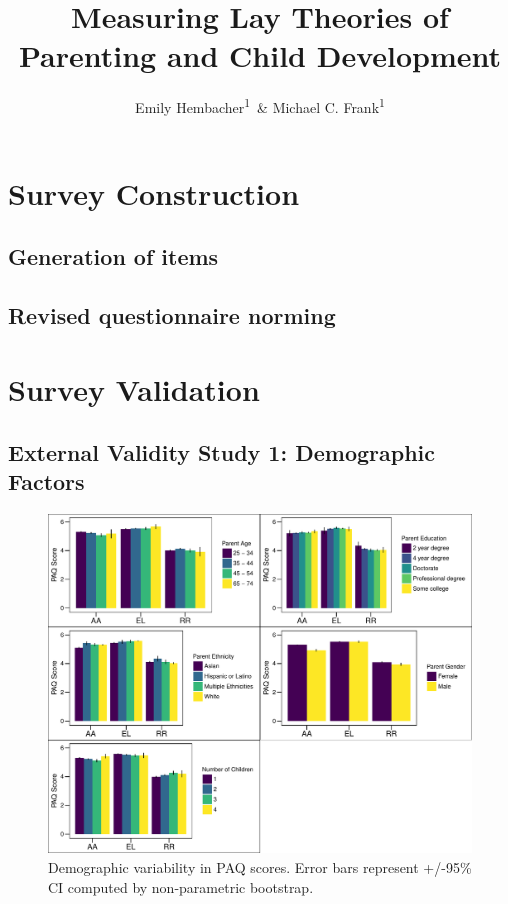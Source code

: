 \documentclass[man]{apa6}
\title{Measuring Lay Theories of Parenting and Child Development}
\author{Emily Hembacher\textsuperscript{1}~\& Michael C. Frank\textsuperscript{1}}
\affiliation{
    \vspace{0.5cm}
          \textsuperscript{1} Stanford University  }
\theoremstyle{definition}
\theoremstyle{definition}
\theoremstyle{definition}
\theoremstyle{remark}
\begin{document}
\maketitle

\setcounter{secnumdepth}{0}



\section{Survey Construction}\label{survey-construction}

\subsection{Generation of items}\label{generation-of-items}

\subsection{Revised questionnaire
norming}\label{revised-questionnaire-norming}

\section{Survey Validation}\label{survey-validation}

\subsection{External Validity Study 1: Demographic
Factors}\label{external-validity-study-1-demographic-factors}

\begin{figure}
\centering
\includegraphics{PAQ_paper_files/figure-latex/demographics-1.pdf}
\caption{\label{fig:demographics}Demographic variability in PAQ scores.
Error bars represent +/-95\% CI computed by non-parametric bootstrap.}
\end{figure}
\end{document}
